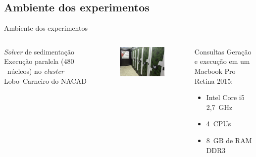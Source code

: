 \documentclass[12pt,compress,final]{beamer}
\begin{document}
\subsection*{Ambiente dos experimentos}
\begin{frame}{Ambiente dos experimentos}

\begin{columns}[t]


\vspace{-.7cm}

\begin{block}{\textit{Solver} de sedimentação}
Execução paralela ($480$~núcleos) no \textit{cluster} Lobo~Carneiro do NACAD\footnotemark{}
\end{block}

\begin{figure}
\includegraphics[width=\textwidth]{img/loboc.jpg}
\end{figure}

\pause


\vspace{-.7cm}

\begin{block}{Consultas}
Geração e execução em um Macbook Pro Retina 2015:

\begin{itemize}
\item Intel Core i5 2,7~GHz
\item 4~CPUs
\item 8~GB de RAM DDR3
\end{itemize}
\end{block}


\end{columns}
\end{frame}
\end{document}
